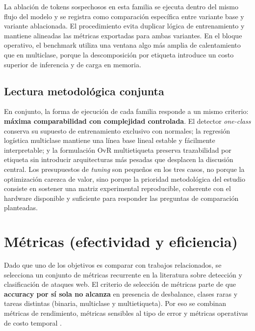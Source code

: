 \documentclass[12pt,oneside]{report}
\begin{document}
La ablación de tokens sospechosos en esta familia se ejecuta dentro del mismo flujo del modelo y se registra como comparación específica entre variante base y variante ablacionada. El procedimiento evita duplicar lógica de entrenamiento y mantiene alineadas las métricas exportadas para ambas variantes. En el bloque operativo, el benchmark utiliza una ventana algo más amplia de calentamiento que en multiclase, porque la descomposición por etiqueta introduce un costo superior de inferencia y de carga en memoria.

\subsection{Lectura metodológica conjunta}
En conjunto, la forma de ejecución de cada familia responde a un mismo criterio: \textbf{máxima comparabilidad con complejidad controlada}. El detector \textit{one-class} conserva su supuesto de entrenamiento exclusivo con normales; la regresión logística multiclase mantiene una línea base lineal estable y fácilmente interpretable; y la formulación OvR multietiqueta preserva trazabilidad por etiqueta sin introducir arquitecturas más pesadas que desplacen la discusión central. Los presupuestos de \textit{tuning} son pequeños en los tres casos, no porque la optimización carezca de valor, sino porque la prioridad metodológica del estudio consiste en sostener una matriz experimental reproducible, coherente con el hardware disponible y suficiente para responder las preguntas de comparación planteadas.

\section{Métricas (efectividad y eficiencia)}
Dado que uno de los objetivos es comparar con trabajos relacionados, se selecciona un conjunto de métricas recurrente en la literatura sobre detección y clasificación de ataques web. El criterio de selección de métricas parte de que \textbf{accuracy por sí sola no alcanza} en presencia de desbalance, clases raras y tareas distintas (binaria, multiclase y multietiqueta). Por eso se combinan métricas de rendimiento, métricas sensibles al tipo de error y métricas operativas de costo temporal \cite{saito_pr_auc,chicco_mcc,srbh_paper,tsoumakas_multilabel_overview}.
\end{document}
